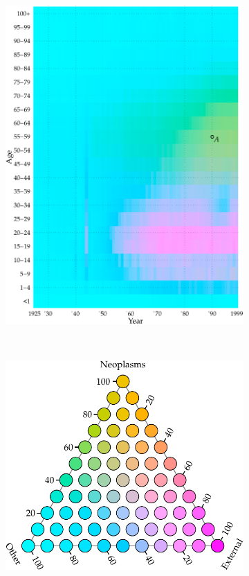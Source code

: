 \documentclass[a4paper]{scrartcl}
\begin{document}
\begin{figure}[htb!]
\begin{subfigure}[t]{0.65\textwidth}
  \includegraphics[width = \textwidth]{../fig/plot-tern_balance_no_lgnd.pdf}
  \label{fig:tbsplot}
  \end{subfigure}%
  ~
  \begin{subfigure}[t]{0.35\textwidth}
  \includegraphics[width = \linewidth]{../fig/plot-tern_balance_lgnd.pdf}

\end{subfigure}
\end{figure}
\end{document}
